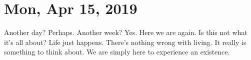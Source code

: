 \section{Mon, Apr 15, 2019}

Another day? Perhaps. Another week? Yes. Here we are again. Is this not what 
it's all about? Life just happens. There's nothing wrong with living. It really 
is something to think about. We are simply here to experience an existence.
